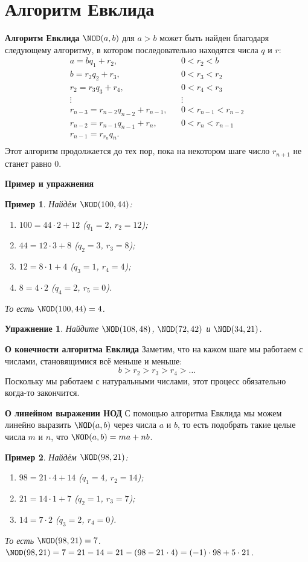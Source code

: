 \documentclass[aspectratio=1610,11pt]{beamer}
\newtheorem{Ex}{Пример}
\newtheorem{Exer}{Упражнение}
\newcommand\fram[2]{\begin{frame}{\bf #1} #2 \end{frame}}
\begin{document}
\section{Алгоритм Евклида}
\fram{Алгоритм Евклида}{
$\NOD(a, b)$ для $a>b$ может быть найден благодаря следующему алгоритму, в котором последовательно находятся числа $q$ и $r$:
\begin{align*}
a = bq_1+r_2, && 0 < r_2 < b \\
b = r_2q_2+r_3, && 0 < r_3 < r_2 \\
r_2 = r_3q_3+r_4, && 0 < r_4 < r_3 \\
\vdots && \vdots \\
r_{n-3} = r_{n-2}q_{n-2}+r_{n-1}, && 0 < r_{n-1} < r_{n-2} \\
r_{n-2} = r_{n-1}q_{n-1}+r_n, && 0 < r_n < r_{n-1} \\
r_{n-1} = r_{r_n}q_n. && \\
\end{align*}
Этот алгоритм продолжается до тех пор, пока на некотором шаге число $r_{n+1}$ не станет равно 0.
}

\fram{Пример и упражнения}{
\large
\begin{Ex}
Найдём $\NOD(100, 44)$:\pause
\begin{enumerate}
\item $100 = 44\cdot2 + 12$ ($q_1= 2$, $r_2= 12$);\pause
\item $44= 12\cdot3+8$ ($q_2= 3$, $r_3= 8$);\pause
\item $12 = 8\cdot1+4$ ($q_3= 1$, $r_4= 4$);\pause
\item $8 = 4\cdot2$ ($q_4= 2$, $r_5= 0$).
\end{enumerate}
То есть $\NOD(100, 44) = 4$.
\end{Ex}

\begin{Exer}
Найдите $\NOD(108, 48)$, $\NOD(72, 42)$ и $\NOD(34, 21)$.
\end{Exer}
}

\fram{О конечности алгоритма Евклида}{
\Large
Заметим, что на кажом шаге мы работаем с числами, становящимися всё меньше и меньше: $$b >r_2>r_3>r_4>\ldots$$
Поскольку мы работаем с натуральными числами, этот процесс обязательно когда-то закончится.
}

\fram{О линейном выражении НОД}{
\large
С помощью алгоритма Евклида мы можем линейно выразить $\NOD(a,b)$ через числа $a$ и $b$, то есть подобрать такие целые числа $m$ и $n$, что $\NOD(a,b) = ma+nb$.
\begin{Ex}
Найдём $\NOD(98, 21)$:
\begin{enumerate}
\item $98 = 21\cdot4 + 14$ ($q_1= 4$, $r_2= 14$);
\item $21= 14\cdot1+7$ ($q_2= 1$, $r_3= 7$);
\item $14 = 7\cdot2$ ($q_3= 2$, $r_4= 0$).
\end{enumerate}
То есть $\NOD(98, 21) = 7$.\\
$\NOD(98, 21) = 7 = 21-14 = 21-(98-21\cdot4) = (-1)\cdot98+5\cdot21$.
\end{Ex}
}
\end{document}
